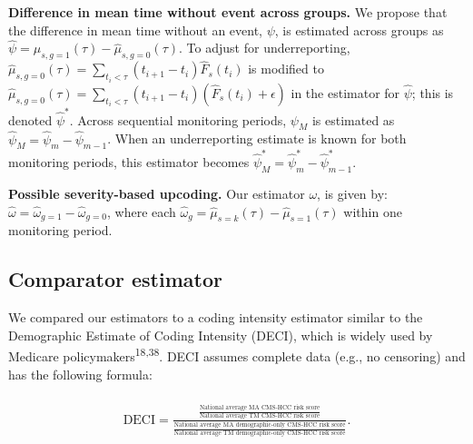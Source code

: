 \documentclass[
  12pt,
  number]{elsarticle}
\begin{document}
\textbf{Difference in mean time without event across groups.} We propose
that the difference in mean time without an event, \(\psi\), is
estimated across groups as
\(\widehat{\psi} = \hat{\mu}_{s,g=1}(\tau) - \hat{\mu}_{s,g=0}(\tau)\).
To adjust for underreporting,
\(\hat{\mu}_{s,g=0}(\tau) = \sum_{t_i < \tau} (t_{i+1} - t_i) \hat{F}_{s}(t_i)\)
is modified to
\(\hat{\mu}_{s,g=0}(\tau) = \sum_{t_i < \tau} (t_{i+1} - t_i) (\hat{F}_{s}(t_i) + \epsilon)\)
in the estimator for \(\widehat{\psi}\); this is denoted
\(\hat{\psi}^*\). Across sequential monitoring periods, \(\psi_M\) is
estimated as \(\hat{\psi}_M = \hat{\psi}_m - \hat{\psi}_{m-1}\). When an
underreporting estimate is known for both monitoring periods, this
estimator becomes
\(\hat{\psi}_M^* = \hat{\psi}^*_m - \hat{\psi}^*_{m-1}\).

\textbf{Possible severity-based upcoding.} Our estimator \(\omega\), is
given by:
\(\widehat{\omega} = \widehat{\omega}_{g=1} - \widehat{\omega}_{g=0}\),
where each
\(\widehat{\omega}_{g} = \hat{\mu}_{s=k}(\tau) - \hat{\mu}_{s=1}(\tau)\)
within one monitoring period.

\subsection{Comparator estimator}\label{sec-comparator-estimator}

We compared our estimators to a coding intensity estimator similar to
the Demographic Estimate of Coding Intensity (DECI), which is widely
used by Medicare policymakers\textsuperscript{18,38}. DECI assumes
complete data (e.g., no censoring) and has the following formula:

\[
\begin{aligned}
\\ \text{DECI} = \frac{\frac{\text{National average MA CMS-HCC risk score}}{\text{National average TM CMS-HCC risk score}}}{\frac{\text{National average MA demographic-only CMS-HCC risk score}}{\text{National average TM demographic-only CMS-HCC risk score}}}.
\end{aligned}
\]
\end{document}

